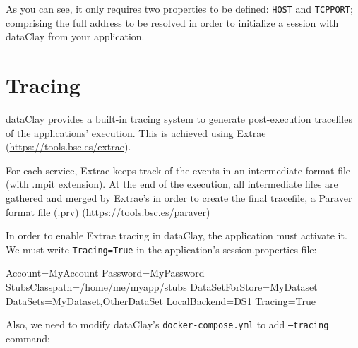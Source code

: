 As you can see, it only requires two properties to be defined: \texttt{HOST} and \texttt{TCPPORT}; comprising the full address to be resolved in order to initialize a session with dataClay from your application.

\section{Tracing}

dataClay provides a built-in tracing system to generate post-execution tracefiles of the applications’ execution. 
This is achieved using Extrae (\href {https://tools.bsc.es/extrae} {https://tools.bsc.es/extrae}).

For each service, Extrae keeps track of the events in an intermediate format file (with .mpit extension). At the end of the execution, all intermediate
files are gathered and merged by Extrae’s in order to create the final
tracefile, a Paraver format file (.prv) (\href {https://tools.bsc.es/paraver} {https://tools.bsc.es/paraver})

In order to enable Extrae tracing in dataClay, the application must activate it. We must write \texttt{Tracing=True} in the application's session.properties file:

\begin{tBox}
 \begin{bash}
  Account=MyAccount
  Password=MyPassword
  StubsClasspath=/home/me/myapp/stubs
  DataSetForStore=MyDataset
  DataSets=MyDataset,OtherDataSet
  LocalBackend=DS1
  Tracing=True
 \end{bash}
\end{tBox}

Also, we need to modify dataClay's \texttt{docker-compose.yml} to add \texttt{--tracing} command: 

